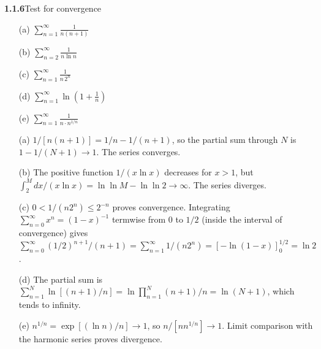 \par\bigskip
\noindent\textbf{1.1.6}\quad Test for convergence
\begin{enumerate}
\item[(a)] $\displaystyle\sum_{n=1}^{\infty}\frac{1}{n(n+1)}$
\item[(b)] $\displaystyle\sum_{n=2}^{\infty}\frac{1}{n\ln n}$
\item[(c)] $\displaystyle\sum_{n=1}^{\infty}\frac{1}{n\,2^{n}}$
\item[(d)] $\displaystyle\sum_{n=1}^{\infty}\ln\left(1+\frac{1}{n}\right)$
\item[(e)] $\displaystyle\sum_{n=1}^{\infty}\frac{1}{n\cdot n^{1/n}}$
\end{enumerate}
\solution
\begin{enumerate}
\item[(a)] $1/[n(n+1)]=1/n-1/(n+1)$, so the partial sum through $N$
is $1-1/(N+1)\to1$. The series converges.
\item[(b)] The positive function $1/(x\ln x)$ decreases for $x>1$, but
$\int_2^M dx/(x\ln x)=\ln\ln M-\ln\ln2\to\infty$.
The series diverges.
\item[(c)] $0<1/(n2^n)\le2^{-n}$ proves convergence. Integrating
$\sum_{n=0}^\infty x^n=(1-x)^{-1}$ termwise from $0$ to $1/2$ (inside
the interval of convergence) gives
$\sum_{n=0}^\infty (1/2)^{n+1}/(n+1)=\sum_{n=1}^\infty 1/(n2^n)
=[-\ln(1-x)]_0^{1/2}=\ln2$.
\item[(d)] The partial sum is
$\sum_{n=1}^N\ln[(n+1)/n]=\ln\prod_{n=1}^N(n+1)/n=\ln(N+1)$,
which tends to infinity.
\item[(e)] $n^{1/n}=\exp[(\ln n)/n]\to1$, so
$n/[n n^{1/n}]\to1$. Limit comparison with the harmonic series
proves divergence.
\end{enumerate}



